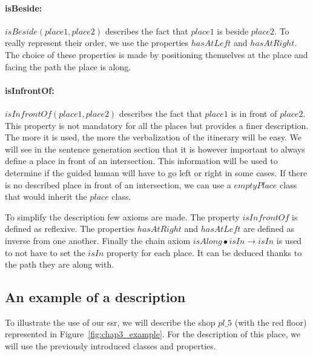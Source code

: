\paragraph{isBeside:} $isBeside(place1,place2)$ describes the fact that $place1$ is beside $place2$. To really represent their order, we use the properties $hasAtLeft$ and $hasAtRight$. The choice of these properties is made by positioning themselves at the place and facing the path the place is along.

\paragraph{isInfrontOf:} $isInfrontOf(place1,place2)$ describes the fact that $place1$ is in front of $place2$. This property is not mandatory for all the places but provides a finer description. The more it is used, the more the verbalization of the itinerary will be easy. We will see in the sentence generation section that it is however important to always define a place in front of an intersection. This information will be used to determine if the guided human will have to go left or right in some cases. If there is no described place in front of an intersection, we can use a $emptyPlace$ class that would inherit the $place$ class.

To simplify the description few axioms are made. The property $isInfrontOf$ is defined as reflexive. The properties $hasAtRight$ and $hasAtLeft$ are defined as inverse from one another. Finally the chain axiom $isAlong \bullet isIn \rightarrow isIn$ is used to not have to set the $isIn$ property for each place. It can be deduced thanks to the path they are along with.

\subsection{An example of a description}

To illustrate the use of our \acrshort{ssr}, we will describe the shop $pl\_5$ (with the red floor) represented in Figure~\ref{fig:chap3_example}. For the description of this place, we will use the previously introduced classes and properties.

